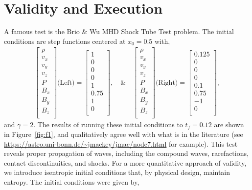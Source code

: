 \documentclass[iop,twocolumn]{emulateapj}
\begin{document}
\section{Validity and Execution}
A famous test is the Brio $\&$ Wu MHD Shock Tube Test problem. The initial conditions are step functions centered at $x_0=0.5$ with,
\begin{align}\label{eq:ic}
  \begin{bmatrix}
    \rho \\
    v_x\\
    v_y\\
    v_z\\
    P\\
    B_x\\
    B_y\\
    B_z\\
  \end{bmatrix}
  \textrm{(Left)}=
  \begin{bmatrix}
    1\\
    0\\
    0\\
    0\\
    1\\
    0.75\\
    1\\
    0\\
  \end{bmatrix}
  ,\quad\&\quad
  \begin{bmatrix}
    \rho \\
    v_x\\
    v_y\\
    v_z\\
    P\\
    B_x\\
    B_y\\
    B_z\\
  \end{bmatrix}
  \textrm{(Right)}=
  \begin{bmatrix}
    0.125\\
    0\\
    0\\
    0\\
    0.1\\
    0.75\\
    -1\\
    0\\
  \end{bmatrix},
\end{align}
and $\gamma=2$. The results of running these initial conditions to $t_f=0.12$ are shown in Figure~\ref{fig:f1}, and qualitatively agree well with what is in the literature (see \url{https://astro.uni-bonn.de/~jmackey/jmac/node7.html} for example). This test reveals proper propagation of waves, including the compound waves, rarefactions, contact discontinuities, and shocks. For a more quantitative approach of validity, we introduce isentropic initial conditions that, by physical design, maintain entropy. The initial conditions were given by,
\end{document}
